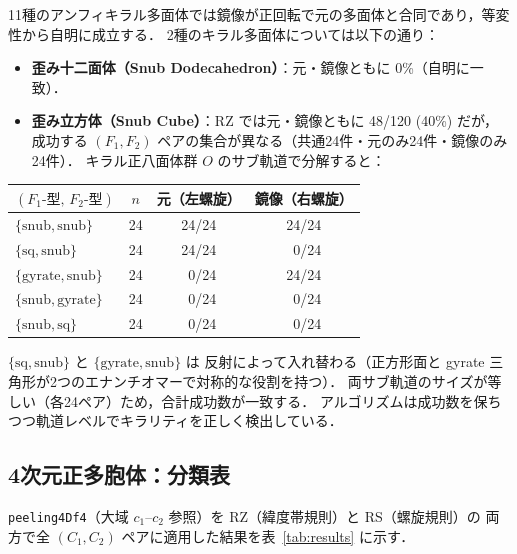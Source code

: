 \documentclass[12pt,a4paper]{article}
\theoremstyle{definition}
\begin{document}
11種のアンフィキラル多面体では鏡像が正回転で元の多面体と合同であり，等変性から自明に成立する．
2種のキラル多面体については以下の通り：

\begin{itemize}
  \item \textbf{歪み十二面体（Snub Dodecahedron）}：元・鏡像ともに 0\%（自明に一致）．
  \item \textbf{歪み立方体（Snub Cube）}：RZ では元・鏡像ともに 48/120 (40\%) だが，
        成功する $(F_1, F_2)$ ペアの集合が異なる（共通24件・元のみ24件・鏡像のみ24件）．
        キラル正八面体群 $O$ のサブ軌道で分解すると：
\end{itemize}

\begin{center}
\renewcommand{\arraystretch}{1.15}
\begin{tabular}{lccc}
\toprule
$(F_1\text{-型},\,F_2\text{-型})$ & $n$ & 元（左螺旋） & 鏡像（右螺旋） \\
\midrule
$\{\mathrm{snub},\mathrm{snub}\}$   & 24 & 24/24 & 24/24 \\
$\{\mathrm{sq},\mathrm{snub}\}$     & 24 & 24/24 & \ 0/24 \\
$\{\mathrm{gyrate},\mathrm{snub}\}$ & 24 & \ 0/24 & 24/24 \\
$\{\mathrm{snub},\mathrm{gyrate}\}$ & 24 & \ 0/24 & \ 0/24 \\
$\{\mathrm{snub},\mathrm{sq}\}$     & 24 & \ 0/24 & \ 0/24 \\
\bottomrule
\end{tabular}
\end{center}

$\{\mathrm{sq},\mathrm{snub}\}$ と $\{\mathrm{gyrate},\mathrm{snub}\}$ は
反射によって入れ替わる（正方形面と gyrate 三角形が2つのエナンチオマーで対称的な役割を持つ）．
両サブ軌道のサイズが等しい（各24ペア）ため，合計成功数が一致する．
アルゴリズムは成功数を保ちつつ軌道レベルでキラリティを正しく検出している．

\subsection{4次元正多胞体：分類表}
\label{ssec:res4d}

\texttt{peeling4Df4}（大域 $c_1$--$c_2$ 参照）を RZ（緯度帯規則）と RS（螺旋規則）の
両方で全 $(C_1, C_2)$ ペアに適用した結果を表~\ref{tab:results} に示す．
\end{document}
